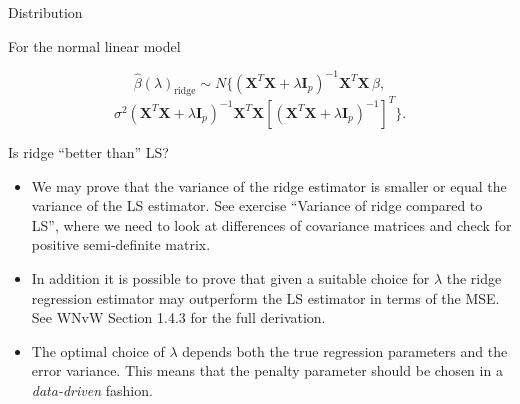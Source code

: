\documentclass[
  ignorenonframetext,
]{beamer}
\begin{document}
\begin{frame}

\begin{block}{Distribution}

For the normal linear model

\[\hat{\beta}(\lambda)_{\text{ridge}} \sim N \{ (\mathbf{X}^T \mathbf{X} + \lambda \mathbf{I}_{p})^{-1} \mathbf{X}^T \mathbf{X} \, \beta,\]
\[\sigma^2 ( \mathbf{X}^T \mathbf{X} + \lambda \mathbf{I}_{p} )^{-1}  \mathbf{X}^T \mathbf{X} [ ( \mathbf{X}^T \mathbf{X} + \lambda \mathbf{I}_{p} )^{-1} ]^T \}.
\]

\end{block}

\end{frame}

\begin{frame}

\begin{block}{Is ridge ``better than'' LS?}

\begin{itemize}
\item
  We may prove that the variance of the ridge estimator is smaller or
  equal the variance of the LS estimator. See exercise ``Variance of
  ridge compared to LS'', where we need to look at differences of
  covariance matrices and check for positive semi-definite matrix.
\item
  In addition it is possible to prove that given a suitable choice for
  \(\lambda\) the ridge regression estimator may outperform the LS
  estimator in terms of the MSE. See WNvW Section 1.4.3 for the full
  derivation.
\item
  The optimal choice of \(\lambda\) depends both the true regression
  parameters and the error variance. This means that the penalty
  parameter should be chosen in a \emph{data-driven} fashion.
\end{itemize}

\end{block}

\end{frame}
\end{document}
